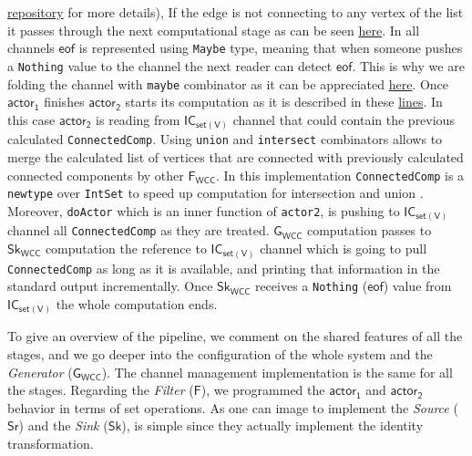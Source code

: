 \documentclass[preprint]{elsarticle}
\newcommand{\iwcc}{\mathsf{Sr}}
\newcommand{\owcc}{\mathsf{Sk}}
\newcommand{\owc}{\mathsf{Sk_{WCC}}}
\newcommand{\fwcc}{\mathsf{F}}
\newcommand{\fwc}{\mathsf{F_{WCC}}}
\newcommand{\gwc}{\mathsf{G_{WCC}}}
\newcommand{\csofv}{\mathsf{IC_{set(V)}}}
\newcommand{\eof}{\mathsf{eof}}
\newcommand{\Act}{\mathsf{actor_1}}
\newcommand{\Actt}{\mathsf{actor_2}}
\begin{document}
\href{https://github.com/jproyo/upc-miri-tfm/blob/17ee929f64a8be8a88ced782bfcf6bf355d8580a/connected-comp/src/ConnComp/Internal.hs#L50-L73}{repository} for more details), If the edge is not connecting to any vertex of the list it passes through the next computational stage as can be seen \href{https://github.com/jproyo/upc-miri-tfm/blob/17ee929f64a8be8a88ced782bfcf6bf355d8580a/connected-comp/src/ConnComp/Internal.hs#L55-L59}{here}. In all channels $\eof$ is represented using \texttt{Maybe} type, meaning that when someone pushes a \texttt{Nothing} value to the channel the next reader can detect $\eof$. This is why we are folding the channel with \texttt{maybe} combinator as it can be appreciated \href{https://github.com/jproyo/upc-miri-tfm/blob/17ee929f64a8be8a88ced782bfcf6bf355d8580a/connected-comp/src/ConnComp/Internal.hs#L51}{here}. Once $\Act$ finishes $\Actt$ starts its computation as it is described in these \href{https://github.com/jproyo/upc-miri-tfm/blob/17ee929f64a8be8a88ced782bfcf6bf355d8580a/connected-comp/src/ConnComp/Internal.hs#L62-L73}{lines}. In this case $\Actt$ is reading from $\csofv$ channel that could contain the previous calculated \texttt{ConnectedComp}. Using \texttt{union} and \texttt{intersect} combinators allows to merge the calculated list of vertices that are connected with previously calculated connected components by other $\fwc$. In this implementation \texttt{ConnectedComp} is a \texttt{newtype} over \texttt{IntSet} to speed up computation for intersection and union \cite{containers}. Moreover,  \texttt{doActor} which is an inner function of \texttt{actor2}, is pushing to $\csofv$ channel all \texttt{ConnectedComp} as they are treated. $\gwc$ computation passes to $\owc$ computation the reference to $\csofv$ channel which is going to pull \texttt{ConnectedComp} as long as it is available, and printing that information in the standard output incrementally. Once $\owc$ receives a \texttt{Nothing} ($\eof$) value from $\csofv$ the whole computation ends.


\iffalse
 To give an overview of the pipeline, we comment on the shared features of all the stages, and we go deeper into the configuration of the whole system and the \textit{Generator} ($\gwc$). The channel management implementation is the same for all the stages. Regarding the \textit{Filter} ($\fwcc$), we programmed the $\Act$ and $\Actt$ behavior in terms of set operations. As one can image to implement the  \textit{Source} ($\iwcc$) and the  \textit{Sink} ($\owcc$), is simple since they actually implement the identity transformation.
 
\end{document}
